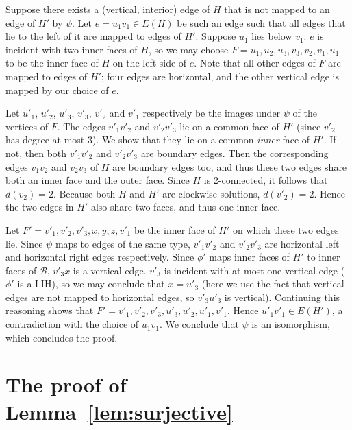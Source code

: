 \documentclass{llncs}
\newcommand{\QED}{\hspace*{\fill}{$\Box$}\medskip}
\newcommand{\BW}{\mathcal{B}}
\begin{document}
Suppose there exists a (vertical, interior) edge of $H$ that is not mapped to an edge of $H'$ by $\psi$. Let $e=u_1v_1\in E(H)$ be such an edge such that all edges that lie to the left of it
are mapped to edges of $H'$. Suppose $u_1$ lies below $v_1$.
$e$ is incident with two inner faces of $H$, so we may choose $F=u_1,u_2,u_3,v_3,v_2,v_1,u_1$ to be the inner face of $H$ on the left side of $e$. Note that all other edges of $F$ are mapped to edges of $H'$; four edges are horizontal, and the other vertical edge is mapped by our choice of $e$.

Let $u'_1$, $u'_2$, $u'_3$, $v'_3$, $v'_2$ and $v'_1$ respectively be the images under $\psi$ of the vertices of $F$. 
The edges $v'_1v'_2$ and $v'_2v'_3$ lie on a common face of $H'$ (since $v'_2$ has degree at most 3). We show that they lie on a common {\em inner} face of $H'$. If not, then both $v'_1v'_2$ and $v'_2v'_3$ are boundary edges. Then the corresponding edges $v_1v_2$ and $v_2v_3$ of $H$ are boundary edges too, and thus these two edges share both an inner face and the outer face. Since $H$ is 2-connected, it follows that $d(v_2)=2$. Because both $H$ and $H'$ are clockwise solutions, $d(v'_2)=2$. Hence the two edges in $H'$ also share two faces, and thus one inner face. 


Let $F'=v'_1,v'_2,v'_3,x,y,z,v'_1$ be the inner face of $H'$ on which these two edges lie. Since $\psi$ maps to edges of the same type, $v'_1v'_2$ and $v'_2v'_3$ are horizontal left and horizontal right edges respectively.
Since $\phi'$ maps inner faces of $H'$ to inner faces of $\BW$, $v'_3x$ is a vertical edge. $v'_3$ is incident with at most one vertical edge ($\phi'$ is a LIH), so we may conclude that $x=u'_3$ (here we use the fact that vertical edges are not mapped to horizontal edges, so $v'_3u'_3$ is vertical). Continuing this reasoning shows that $F'=v'_1,v'_2,v'_3,u'_3,u'_2,u'_1,v'_1$. Hence $u'_1v'_1\in E(H')$, a contradiction with the choice of $u_1v_1$. We conclude that $\psi$ is an isomorphism, which concludes the proof.\QED



\section{The proof of Lemma~\ref{lem:surjective}}
\label{sec:surjective}
\end{document}
